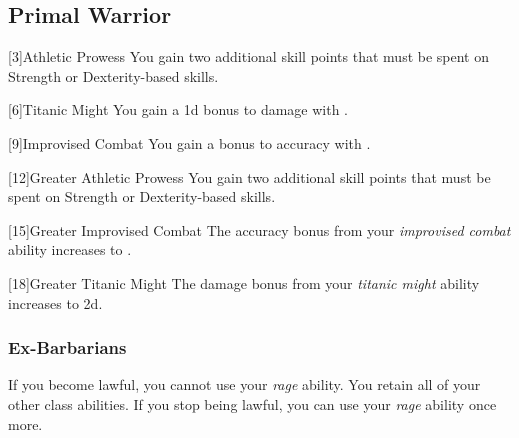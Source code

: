         \subsection{Primal Warrior}
            [3]{Athletic Prowess} You gain two additional skill points that must be spent on Strength or Dexterity-based skills.

            [6]{Titanic Might}
            You gain a \plus1d bonus to damage with .

            [9]{Improvised Combat} 
            You gain a  bonus to accuracy with .

            [12]{Greater Athletic Prowess} You gain two additional skill points that must be spent on Strength or Dexterity-based skills.

            [15]{Greater Improvised Combat} 
            The accuracy bonus from your \textit{improvised combat} ability increases to .

            [18]{Greater Titanic Might}
            The damage bonus from your \textit{titanic might} ability increases to \plus2d.

        \subsubsection{Ex-Barbarians}
            If you become lawful, you cannot use your \textit{rage} ability.
            You retain all of your other class abilities.
            If you stop being lawful, you can use your \textit{rage} ability once more.

